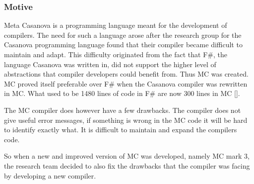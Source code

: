 \subsubsection {Motive}

Meta Casanova is a programming language meant for the development of compilers. 
The need for such a language arose after the research group for the Casanova programming language found that their compiler became difficult to maintain and adapt. 
This difficulty originated from the fact that F\#, 
the language Casanova was written in, did not support the higher level of  abstractions that compiler developers could benefit from. 
Thus MC was created. 
MC proved itself preferable over F\# when the Casanova compiler was rewritten in MC. 
What used to be 1480 lines of code in F\# are now 300 lines in MC []. 

The MC compiler does however have a few drawbacks. 
The compiler does not give useful error messages, if something is wrong in the MC code it will be hard to identify exactly what. 
It is difficult to maintain and expand the compilers code. 

So when a new and improved version of MC was developed, namely MC mark 3,  
the research team decided to also fix the drawbacks that the compiler was facing by developing a new compiler. 

